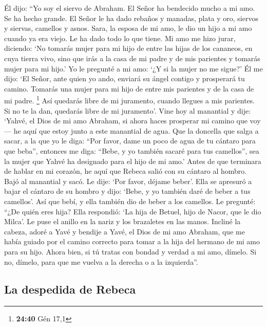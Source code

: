  Él dijo: ``Yo soy el siervo de Abraham. 
El Señor ha bendecido mucho a mi amo. Se ha hecho grande. El Señor le ha
dado rebaños y manadas, plata y oro, siervos y siervas, camellos y
asnos.  Sara, la esposa de mi amo, le dio un hijo a mi
amo cuando ya era viejo. Le ha dado todo lo que tiene. 
Mi amo me hizo jurar, diciendo: `No tomarás mujer para mi hijo de entre
las hijas de los cananeos, en cuya tierra vivo,  sino que
irás a la casa de mi padre y de mis parientes y tomarás mujer para mi
hijo.'  Yo le pregunté a mi amo: `¿Y si la mujer no me
sigue?'  Él me dijo: `El Señor, ante quien yo ando,
enviará su ángel contigo y prosperará tu camino. Tomarás una mujer para
mi hijo de entre mis parientes y de la casa de mi padre. \footnote{\textbf{24:40}
  Gén 17,1}  Así quedarás libre de mi juramento, cuando
llegues a mis parientes. Si no te la dan, quedarás libre de mi
juramento'.  Vine hoy al manantial y dije: `Yahvé, el
Dios de mi amo Abraham, si ahora haces prosperar mi camino que voy ---
 he aquí que estoy junto a este manantial de agua. Que la
doncella que salga a sacar, a la que yo le diga: ``Por favor, dame un
poco de agua de tu cántaro para que beba'',  entonces me
diga: ``Bebe, y yo también sacaré para tus camellos'', sea la mujer que
Yahvé ha designado para el hijo de mi amo.'  Antes de que
terminara de hablar en mi corazón, he aquí que Rebeca salió con su
cántaro al hombro. Bajó al manantial y sacó. Le dije: `Por favor, déjame
beber'.  Ella se apresuró a bajar el cántaro de su hombro
y dijo: `Bebe, y yo también daré de beber a tus camellos'. Así que bebí,
y ella también dio de beber a los camellos.  Le pregunté:
``¿De quién eres hija? Ella respondió: `La hija de Betuel, hijo de
Nacor, que le dio Milca'. Le puse el anillo en la nariz y los brazaletes
en las manos.  Incliné la cabeza, adoré a Yavé y bendije
a Yavé, el Dios de mi amo Abraham, que me había guiado por el camino
correcto para tomar a la hija del hermano de mi amo para su hijo.
 Ahora bien, si tú tratas con bondad y verdad a mi amo,
dímelo. Si no, dímelo, para que me vuelva a la derecha o a la
izquierda''.

\hypertarget{la-despedida-de-rebeca}{%
\subsection{La despedida de Rebeca}\label{la-despedida-de-rebeca}}

